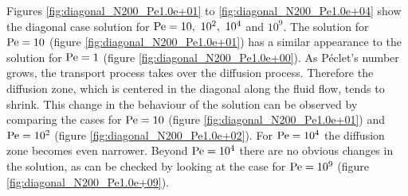 \clearpage
Figures \ref{fig:diagonal_N200_Pe1.0e+01} to \ref{fig:diagonal_N200_Pe1.0e+04}
show the diagonal case solution for $\mathrm{Pe} = 10, \ 10^2, \ 10^4$ and $10^9$.
The solution for $\mathrm{Pe} = 10$ (figure \ref{fig:diagonal_N200_Pe1.0e+01}) has a
similar appearance to the solution for $\mathrm{Pe} = 1$ (figure
\ref{fig:diagonal_N200_Pe1.0e+00}). As Péclet's number grows, the transport
process takes over the diffusion process. Therefore the diffusion zone, which is
centered in the diagonal along the fluid flow, tends to shrink. This change in
the behaviour of the solution can be observed by comparing the cases for
$\mathrm{Pe} = 10$ (figure \ref{fig:diagonal_N200_Pe1.0e+01}) and $\mathrm{Pe} = 10^2$
(figure \ref{fig:diagonal_N200_Pe1.0e+02}). For $\mathrm{Pe} = 10^4$ the diffusion
zone becomes even narrower. Beyond $\mathrm{Pe} = 10^4$ there are no obvious changes
in the solution, as can be checked by looking at the case for $\mathrm{Pe} = 10^9$
(figure \ref{fig:diagonal_N200_Pe1.0e+09}).

